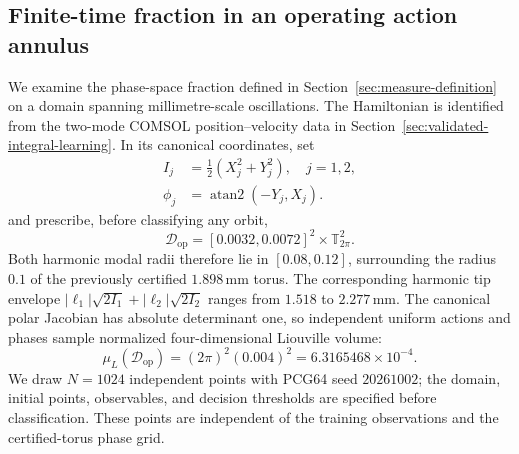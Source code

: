 \subsection{Finite-time fraction in an operating action annulus}
\label{sec:measure-numerical}
We examine the phase-space fraction defined in
Section~\ref{sec:measure-definition} on a domain spanning millimetre-scale
oscillations. The Hamiltonian is identified from the two-mode COMSOL
position--velocity data in Section~\ref{sec:validated-integral-learning}.
In its canonical coordinates, set
\begin{equation}
 \begin{aligned}
 I_j&=\tfrac12(X_j^2+Y_j^2),\quad j=1,2,\\
 \phi_j&=\operatorname{atan2}(-Y_j,X_j).
 \end{aligned}
 \label{eq:measure-operating-actions}
\end{equation}
and prescribe, before classifying any orbit,
\begin{equation}
 \mathcal D_{\mathrm{op}}=[0.0032,0.0072]^2\times\mathbb T^2_{2\pi}.
 \label{eq:measure-operating-domain}
\end{equation}
Both harmonic modal radii therefore lie in $[0.08,0.12]$, surrounding the
radius $0.1$ of the previously certified $1.898\,\mathrm{mm}$ torus.
The corresponding harmonic tip envelope
$|\ell_1|\sqrt{2I_1}+|\ell_2|\sqrt{2I_2}$ ranges from
$1.518$ to $2.277\,\mathrm{mm}$.
The canonical polar Jacobian has absolute determinant one, so independent
uniform actions and phases sample normalized four-dimensional Liouville volume:
\begin{equation}
 \mu_L(\mathcal D_{\mathrm{op}})
   =(2\pi)^2(0.004)^2=6.3165468\times10^{-4}.
 \label{eq:measure-operating-volume}
\end{equation}
We draw $N=1024$ independent points with PCG64 seed $20261002$; the domain,
initial points, observables, and decision thresholds are specified before
classification. These points are independent of the training observations and the
certified-torus phase grid.

